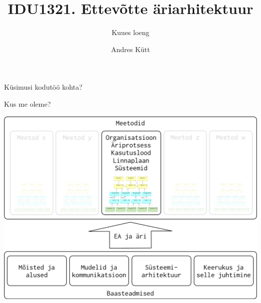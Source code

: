 \documentclass{beamer}
\title{IDU1321. Ettevõtte äriarhitektuur}
\subtitle{Kuues loeng}
\author{Andres Kütt}
\institute{Arhitekt}
\begin{document}
\begin{frame}
\titlepage
\end{frame}



\begin{frame}[standout]
Küsimusi kodutöö kohta?
\end{frame}


\begin{frame}{Kus me oleme?}
	\begin{center}
		\includegraphics[width=.8\textwidth]{aine_struktuur}
	\end{center}
\end{frame}
\end{document}
